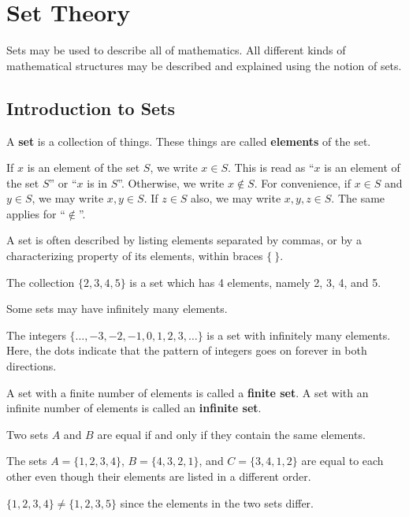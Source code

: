 \chapter{Set Theory}
Sets may be used to describe all of mathematics. All different kinds of mathematical structures may be described and explained using the notion of sets.

\section{Introduction to Sets}
\begin{definition}
    A \textbf{set} is a collection of things. These things are called \textbf{elements} of the set.
\end{definition}
If $x$ is an element of the set $S$, we write $x \in S$. This is read as ``$x$ is an element of the set $S$'' or ``$x$ is in $S$''. Otherwise, we write $x \notin S$. For convenience, if $x \in S$ and $y \in S$, we may write $x, y \in S$. If $z \in S$ also, we may write $x, y, z \in S$. The same applies for ``$\notin$''.

A set is often described by listing elements separated by commas, or by a characterizing property of its elements, within braces $\{ \ \}$. 
\begin{example}
    The collection $\{2, 3, 4, 5\}$ is a set which has 4 elements, namely 2, 3, 4, and 5.
\end{example}
Some sets may have infinitely many elements.
\begin{example}
    The integers $\{\dots, -3, -2, -1, 0, 1, 2, 3, \dots\}$ is a set with infinitely many elements. Here, the dots indicate that the pattern of integers goes on forever in both directions.
\end{example}

\begin{definition}
    A set with a finite number of elements is called a \textbf{finite set}. A set with an infinite number of elements is called an \textbf{infinite set}.
\end{definition}

\begin{definition}
    Two sets $A$ and $B$ are equal if and only if they contain the same elements.
\end{definition}
\begin{example}
    The sets $A = \{1, 2, 3, 4\}$, $B = \{4, 3, 2, 1\}$, and $C = \{3, 4, 1, 2\}$ are equal to each other even though their elements are listed in a different order.
\end{example}
\begin{example}
    $\{1, 2, 3, 4\} \neq \{1, 2, 3, 5\}$ since the elements in the two sets differ.
\end{example}

